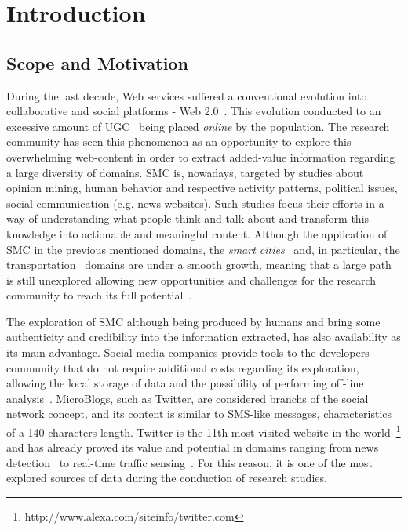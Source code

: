 \chapter{Introduction} \label{chap:intro}

\minitoc \mtcskip \noindent

\section{Scope and Motivation}\label{sec:scope_motivation}

During the last decade, Web services suffered a conventional evolution into collaborative and social platforms - Web 2.0~\cite{chi2008social}. This evolution conducted to an excessive amount of \gls{UGC}~\cite{kaplan2010users} being placed \textit{online} by the population. The research community has seen this phenomenon as an opportunity to explore this overwhelming web-content in order to extract added-value information regarding a large diversity of domains. \gls{SMC} is, nowadays, targeted by studies about opinion mining, human behavior and respective activity patterns, political issues, social communication (e.g. news websites). Such studies focus their efforts in a way of understanding what people think and talk about and transform this knowledge into actionable and meaningful content. Although the application of \gls{SMC} in the previous mentioned domains, the \textit{smart cities}~\cite{batty2012smart} and, in particular, the transportation~\cite{gal2014potential} domains are under a smooth growth, meaning that a large path is still unexplored allowing new opportunities and challenges for the research community to reach its full potential~\cite{musto2015crowdpulse}.

The exploration of \gls{SMC} although being produced by humans and bring some authenticity and credibility into the information extracted, has also availability as its main advantage. Social media companies provide tools to the developers community that do not require additional costs regarding its exploration, allowing the local storage of data and the possibility of performing off-line analysis~\cite{kuflik2017automating}. \glspl{MicroBlog}, such as Twitter, are considered branchs of the social network concept, and its content is similar to SMS-like messages, characteristics of a 140-characters length. Twitter is the 11th most visited website in the world~\footnote{http://www.alexa.com/siteinfo/twitter.com} and has already proved its value and potential in domains ranging from news detection~\cite{kn:Sankaranarayanan2009} to real-time traffic sensing~\cite{carvalho2010real}. For this reason, it is one of the most explored sources of data during the conduction of research studies.

